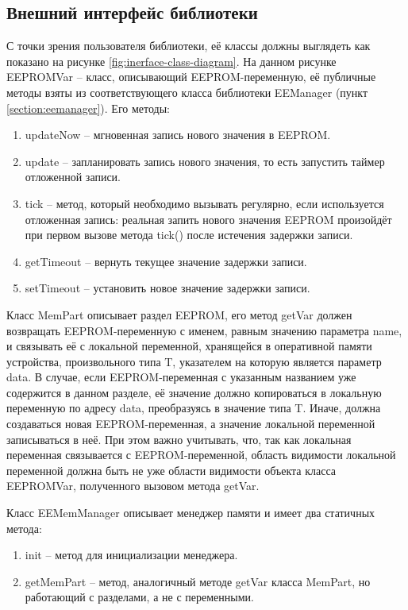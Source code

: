 

\subsection{Внешний интерфейс библиотеки}

С точки зрения пользователя библиотеки, её классы должны выглядеть как показано на рисунке \ref{fig:inerface-class-diagram}.
На данном рисунке EEPROMVar -- класс, описывающий EEPROM-переменную, её публичные методы взяты из соответствующего класса библиотеки EEManager (пункт \ref{section:eemanager}).
Его методы:
\begin{enumerate}
	\item updateNow -- мгновенная запись нового значения в EEPROM.
	\item update -- запланировать запись нового значения, то есть запустить таймер отложенной записи.
	\item tick -- метод, который необходимо вызывать регулярно, если используется отложенная запись: реальная запить нового значения EEPROM произойдёт при первом вызове метода tick() после истечения задержки записи.
	\item getTimeout -- вернуть текущее значение задержки записи.
	\item setTimeout -- установить новое значение задержки записи.
\end{enumerate}

Класс MemPart описывает раздел EEPROM, его метод getVar должен возвращать EEPROM-переменную с именем, равным значению параметра name, и связывать её с локальной переменной, хранящейся в оперативной памяти устройства, произвольного типа T, указателем на которую является параметр data.
В случае, если EEPROM-переменная с указанным названием уже содержится в данном разделе, её значение должно копироваться в локальную переменную по адресу data, преобразуясь в значение типа T.
Иначе, должна создаваться новая EEPROM-переменная, а значение локальной переменной записываться в неё.
При этом важно учитывать, что, так как локальная переменная связывается с EEPROM-переменной, область видимости локальной переменной должна быть не уже области видимости объекта класса EEPROMVar, полученного вызовом метода getVar.

Класс EEMemManager описывает менеджер памяти и имеет два статичных метода:
\begin{enumerate}
	\item init -- метод для инициализации менеджера.
	\item getMemPart -- метод, аналогичный методе getVar класса MemPart, но работающий с разделами, а не с переменными.
\end{enumerate}

